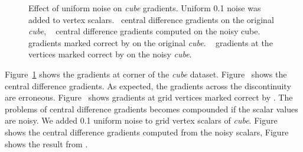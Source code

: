 \begin{figure}[tb]
    \centering
    \vspace{-3mm}
    \caption{Effect of uniform noise on \textit{cube} gradients. Uniform 0.1 noise was added to vertex scalars.~\protect{} central difference gradients on the original \textit{cube}, ~\protect{}  central difference gradients computed on the noisy cube.
    ~\protect{}  gradients marked correct by \protect\ReliGrad on the original \textit{cube}. ~\protect{} gradients at the vertices marked correct by \protect\ReliGrad on the noisy \textit{cube}. }
    \label{fig:cube:noise}
\end{figure}
Figure~\ref{fig:cube:noise} shows the gradients at corner of the \textit{cube} dataset.
Figure~ shows the central difference gradients. As expected, the gradients across the discontinuity are erroneous.
Figure~ shows gradients at grid vertices marked correct by \protect\ReliGrad.
The problems of central difference gradients becomes compounded if the scalar values are noisy. We added 0.1 uniform noise to grid vertex scalars of \emph{cube}. Figure~ shows the central difference  gradients computed from the noisy scalars, Figure~ shows the result from \ReliGrad.
